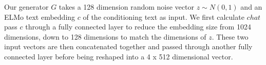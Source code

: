 Our generator $G$ takes a 128 dimension random noise vector $z \sim N(0, 1)$ and an ELMo text embedding $c$ of the conditioning text as input. We first calculate $chat$ pass $c$ through a fully connected layer to reduce the embedding size from 1024 dimensions, down to 128 dimensions to match the dimensions of $z$. These two input vectors are then concatenated together and passed through another fully connected layer before being reshaped into a 4 x 512 dimensional vector.